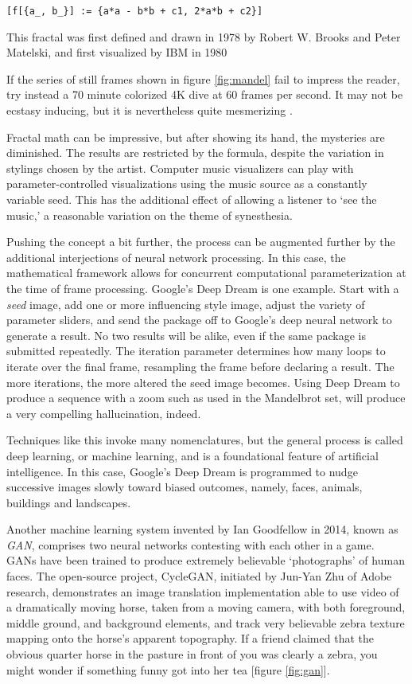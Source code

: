 \documentclass{UIdahoMastersThesis}
\begin{document}
\verb|[f[{a_, b_}] := {a*a - b*b + c1, 2*a*b + c2}]|

This fractal was first defined and drawn in 1978 by Robert W. Brooks and Peter Matelski, and first visualized by IBM in 1980 \cite{taylor2008biophilic}

If the series of still frames shown in figure \ref{fig:mandel} fail to impress the reader, try instead a 70 minute colorized 4K dive at 60 frames per second. It may not be ecstasy inducing, but it is nevertheless quite mesmerizing \cite{noauthor_eye_nodate}.

Fractal math can be impressive, but after showing its hand, the mysteries are diminished. The results are restricted by the formula, despite the variation in stylings chosen by the artist. Computer music visualizers can play with parameter-controlled visualizations using the music source as a constantly variable seed. This has the additional effect of allowing a listener to `see the music,' a reasonable variation on the theme of synesthesia.
 
Pushing the concept a bit further, the process can be augmented further by the additional interjections of neural network processing. In this case, the mathematical framework allows for concurrent computational parameterization at the time of frame processing. Google's Deep Dream is one example. Start with a \emph{seed} image, add one or more influencing style image, adjust the variety of parameter sliders, and send the package off to Google's deep neural network to generate a result. No two results will be alike, even if the same package is submitted repeatedly. The iteration parameter determines how many loops to iterate over the final frame, resampling the frame before declaring a result. The more iterations, the more altered the seed image becomes. Using Deep Dream to produce a sequence with a zoom such as used in the Mandelbrot set, will produce a very compelling hallucination, indeed. 

Techniques like this invoke many nomenclatures, but the general process is called deep learning, or machine learning, and is a foundational feature of artificial intelligence. In this case, Google's Deep Dream is programmed to nudge successive images slowly toward biased outcomes, namely, faces, animals, buildings and landscapes. 

Another machine learning system invented by Ian Goodfellow in 2014, known as \textit{\ac{GAN}}, comprises two neural networks contesting with each other in a game. \acp{GAN} have been trained to produce extremely believable `photographs' of human faces. The open-source project, CycleGAN, initiated by Jun-Yan Zhu of Adobe research, demonstrates an image translation implementation able to use video of a dramatically moving horse, taken from a moving camera, with both foreground, middle ground, and background elements, and track very believable zebra texture mapping onto the horse's apparent topography. If a friend claimed that the obvious quarter horse in the pasture in front of you was clearly a zebra, you might wonder if something funny got into her tea [figure \ref{fig:gan}].
\end{document}
